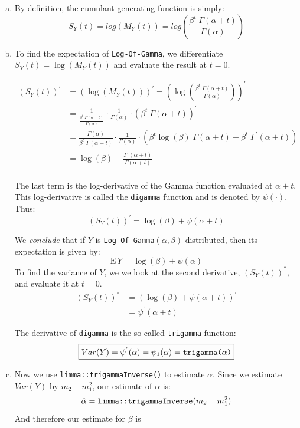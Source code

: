 \documentclass[12pt]{article}
\begin{document}
\begin{enumerate}[(a)]

\item By definition, the cumulant generating function is simply:
$$
S_Y(t) = log(M_Y(t)) = log \left(\frac{\beta^t \; \Gamma(\alpha + t)}{\Gamma(\alpha)} \right)
$$
\item 
To find the expectation of \texttt{Log-Of-Gamma}, we differentiate $S_Y(t) = \log (M_Y(t))$ and evaluate the result at $t = 0$.

\begin{align*}
(S_Y(t))^{'} &= (\log (M_Y(t)))^{'} = \left(\log \left(\frac{\beta^t \; \Gamma(\alpha + t)}{\Gamma(\alpha)} \right)\right)^{'} \\
&= \frac{1}{\frac{\beta^t \; \Gamma(\alpha + t)} {\Gamma(\alpha)}} \cdot \frac{1}{\Gamma(\alpha)} \cdot \left(  \beta^t \: \Gamma(\alpha + t)  \right)^{'}\\
&= \frac{\Gamma(\alpha)}{\beta^t \; \Gamma(\alpha + t)}  \cdot \frac{1}{\Gamma(\alpha)} \cdot \left(  \beta^t \log(\beta) \; \Gamma(\alpha + t) + \beta^t \; \Gamma^{'} (\alpha +t) \right)\\
&= \log(\beta) + \frac{\Gamma^{'} (\alpha +t) }{\Gamma(\alpha + t)}\\
\end{align*}


The last term is the log-derivative of the Gamma function evaluated at $\alpha + t$. This log-derivative is called the \texttt{digamma} function and is denoted by $\psi(\cdot)$. Thus:
$$
(S_Y(t))^{'} =  \log(\beta) +\psi(\alpha +t)
$$

We \emph{conclude} that if $Y$ is \texttt{Log-Of-Gamma}$(\alpha, \beta)$ distributed, then its expectation is given by:
$$
 \boxed{\mathrm{E}\, Y =  \log(\beta) +\psi(\alpha)}
$$
To find the variance of $Y$, we we look at the second derivative, $(S_Y(t))^{''}$, and evaluate it at $t=0$.
\begin{align*}
(S_Y(t))^{''} &= (\log(\beta) +\psi(\alpha +t))^{'}\\
&= \psi^{'}(\alpha +t)
\end{align*}

The derivative of \texttt{digamma} is the so-called \texttt{trigamma} function:
$$
\boxed{Var(Y) = \psi^{'}(\alpha) = \psi_1(\alpha) =  \text{\texttt{trigamma($\alpha$)}}}
$$

\item Now we use \texttt{limma::trigammaInverse()} to estimate $\alpha$. Since we estimate $Var(Y)$ by $m_2 - m_1^2$, our estimate of $\alpha$ is:
$$
\hat\alpha = \text{\texttt{limma::trigammaInverse}}(m_2 - m_1^2)
$$
And therefore our estimate for $\beta$ is 


\end{enumerate}
\end{document}
